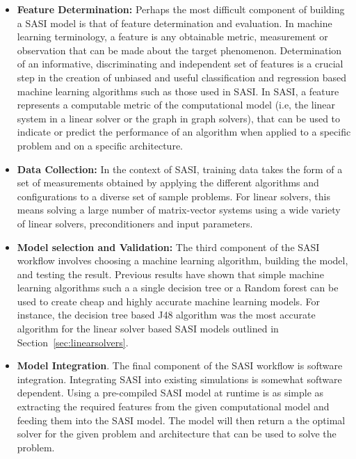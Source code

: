 \begin{itemize}
 \item {\bf Feature Determination:} Perhaps the most difficult component of building a SASI model is that of feature determination and evaluation. In machine learning terminology, a feature is any obtainable metric, measurement or observation that can be made about the target phenomenon. Determination of an informative, discriminating and independent set of features is a crucial step in the creation of unbiased and useful classification and regression based machine learning algorithms such as those used in SASI. In SASI, a feature represents a computable metric of the computational model (i.e, the linear system in a linear solver or the graph in graph solvers), that can be used to indicate or predict the performance of an algorithm when applied to a specific problem and on a specific architecture. 
 
 \item {\bf Data Collection:} In the context of SASI, training data takes the form of a set of measurements obtained by applying the different algorithms and configurations to a diverse set of sample problems. For linear solvers, this means solving a large number of matrix-vector systems using a wide variety of linear solvers, preconditioners and input parameters.
 
 \item {\bf Model selection and Validation:} The third component of the SASI workflow involves choosing a machine learning algorithm, building the model, and testing the result. Previous results have shown that simple machine learning algorithms such a a single decision tree or a Random forest can be used to create cheap and highly accurate machine learning models. For instance, the decision tree based J48 algorithm was the most accurate algorithm for the linear solver based SASI models outlined in Section~\ref{sec:linearsolvers}.  
 
 \item { \bf Model Integration}. The final component of the SASI workflow is software integration. Integrating SASI into existing simulations is somewhat software dependent. Using a pre-compiled SASI model at runtime is as simple as extracting the required features from the given computational model and feeding them into the SASI model. The model will then return a the optimal solver for the given problem and architecture that can be used to solve the problem.  

\end{itemize}

